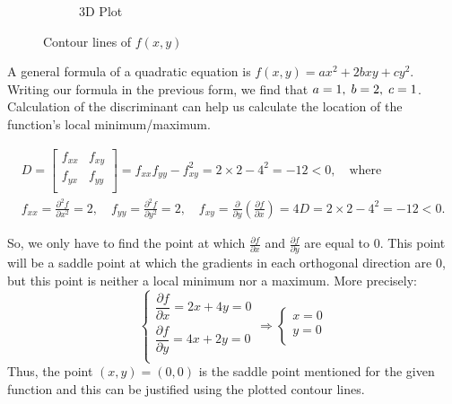 \begin{figure}[h]
\begin{subfigure}{0.4\textwidth}
		\caption{3D Plot}
		\label{fig:prob_1_contour_lines_3d}
	\end{subfigure}
	\caption{Contour lines of $f(x,y)$ }
	\label{fig:prob_1_contour_lines}
\end{figure}

A general formula of a quadratic equation is $f(x,y) = ax^2 + 2bxy + cy^2$. Writing our formula in the previous form, we find that $a=1, \hspace{1mm} b=2, \hspace{1mm} c=1$.
Calculation of the discriminant can help us calculate the location of the function's local minimum/maximum.

\begin{equation}
\begin{gathered}
D =
\left[
\begin{array}{cc}
	f_{xx} & f_{xy} \\
	f_{yx} & f_{yy} \\
\end{array}
\right]
= f_{xx} f_{yy} - f^2_{xy} = 2 \times 2 - 4^2 = -12 < 0, \quad \text{where} \\
f_{xx} = \frac{\partial^2 f}{\partial x^2} = 2, \quad
f_{yy} = \frac{\partial^2 f}{\partial y^2} = 2, \quad
f_{xy} = \frac{\partial}{\partial y} \left( \frac{\partial f}{\partial x} \right) = 4
D = 2 \times 2 - 4^2 = -12 < 0.
\end{gathered}
\end{equation}

So, we only have to find the point at which $\frac{\partial f}{\partial x}$ and $\frac{\partial f}{\partial y}$ are equal to $0$. This point will be a saddle point at which the gradients in each orthogonal direction are $0$, but this point is neither a local minimum nor a maximum.
More precisely:
\begin{equation}
\left\{
\begin{array}{c}
	\dfrac{\partial f}{\partial x} = 2x + 4y = 0 \\[4mm]
	\dfrac{\partial f}{\partial y} = 4x + 2y = 0 \\
\end{array}
\right.
\Rightarrow
\left\{
\begin{array}{c}
	x = 0\\y=0\\
\end{array}
\right.
\end{equation}
Thus, the point $(x,y) = (0,0)$ is the saddle point mentioned for the given function and this can be justified using the plotted contour lines.